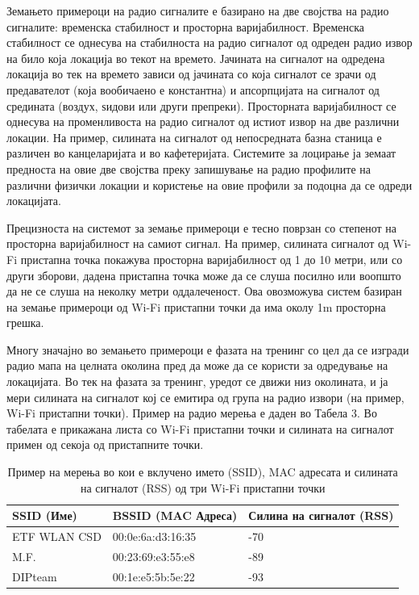 Земањето примероци на радио
сигналите е базирано на две својства на радио сигналите: временска стабилност и
просторна варијабилност. Временска стабилност се однесува на стабилноста на
радио сигналот од одреден радио извор на било која локација во текот на времето.
Јачината на сигналот на одредена локација во тек на времето зависи од јачината
со која сигналот се зрачи од предавателот (која вообичаено е константна) и
апсорпцијата на сигналот од средината (воздух, ѕидови или други препреки).
Просторната варијабилност се однесува на променливоста на радио сигналот од
истиот извор на две различни локации. На пример, силината на сигналот од
непосредната базна станица е различен во канцеларијата и во кафетеријата.
Системите за лоцирање ја земаат предноста на овие две својства преку запишување
на радио профилите на различни физички локации и користење на овие профили за
подоцна да се одреди локацијата. 

Прецизноста на системот за земање примероци е
тесно поврзан со степенот на просторна варијабилност на самиот сигнал. На
пример, силината сигналот од Wi-Fi пристапна точка покажува просторна
варијабилност од 1 до 10 метри, или со други зборови, дадена пристапна точка
може да се слуша посилно или воопшто да не се слуша на неколку метри
оддалеченост. Ова овозможува систем базиран на земање примероци од Wi-Fi
пристапни точки да има околу 1m просторна грешка. 

Многу значајно во земањето
примероци е фазата на тренинг со цел да се изгради радио мапа на целната околина
пред да може да се користи за одредување на локацијата. Во тек на фазата за
тренинг, уредот се движи низ околината, и ја мери силината на сигналот кој се
емитира од група на радио извори (на пример, Wi-Fi пристапни точки). Пример на
радио мерења е даден во Табела 3. Во табелата е прикажана листа со Wi-Fi
пристапни точки и силината на сигналот примен од секоја од пристапните точки.

\begin{table}[!hbp]
\caption{Пример на мерења во кои е вклучено името (SSID), MAC адресата и
силината на сигналот (RSS) од три Wi-Fi пристапни точки}
\begin{tabular}{|p{} | p{} | p{}|}
\hline
SSID (Име) & BSSID (MAC Адреса) & Силина на сигналот (RSS)\\
\hline
ETF WLAN CSD & 00:0e:6a:d3:16:35 & -70\\
\hline
M.F. & 00:23:69:e3:55:e8 & -89\\
\hline
DIPteam & 00:1e:e5:5b:5e:22 & -93\\
\hline
\end{tabular}
\label{tab:samples}
\end{table}


